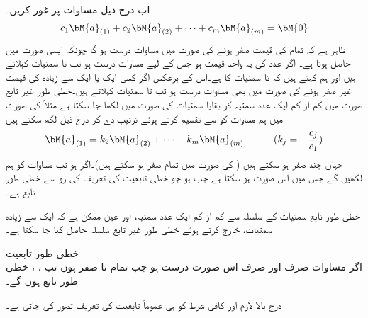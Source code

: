 اب درج ذیل مساوات پر غور کریں۔
\begin{align}\label{مساوات_الجبرا_غیر_تابعیت_الف}
c_1\bM{a}_{(1)}+c_2\bM{a}_{(2)}+\cdots+c_m\bM{a}_{(m)}=\bM{0}
\end{align}
ظاہر ہے کہ تمام  کی قیمت صفر ہونے کی صورت میں مساوات  درست ہو گا چونکہ ایسی صورت میں  حاصل ہوتا ہے۔ اگر  عدد  کی یہ واحد قیمت ہو جس کے لیے مساوات  درست ہو تب  تا  سمتیات  کہلاتے ہیں اور ہم کہتے ہیں کہ   تا  سمتیات کا  ہے۔اس کے برعکس اگر کسی ایک یا ایک سے زیادہ  کی قیمت غیر صفر ہونے کی صورت میں بھی مساوات  درست ہو تب  تا  سمتیات  کہلاتے ہیں۔خطی طور غیر تابع صورت میں کم از کم ایک عدد سمتیہ کو بقایا سمتیات کی صورت میں لکھا جا سکتا ہے مثلاً  کی صورت میں ہم مساوات  کو  سے تقسیم کرتے ہوئے ترتیب دے کر درج ذیل لکھ سکتے ہیں
\begin{align*}
\bM{a}_{(1)}=k_2\bM{a}_{(2)}+\cdots-k_m\bM{a}_{(m)}   \quad \quad\quad (k_j=-\frac{c_j}{c_1})
\end{align*}
جہاں چند  صفر ہو سکتے ہیں ( کی صورت میں تمام  صفر ہو سکتے ہیں)۔اگر  ہو تب  مساوات  کو ہم  لکھیں گے جس میں  اس صورت ہو سکتا ہے جب  ہو جو خطی تابعیت کی تعریف کی رو سے  خطی طور تابع ہے۔

خطی طور تابع سمتیات کے سلسلہ سے کم از کم ایک عدد سمتیہ، اور عین ممکن ہے کہ ایک سے زیادہ سمتیات، خارج کرتے ہوئے خطی طور غیر تابع سلسلہ حاصل کیا جا سکتا ہے۔

\quad خطی طور تابعیت\\
اگر مساوات  صرف اور صرف  اس صورت درست ہو جب تمام  تا  صفر ہوں تب ، ،  خطی طور تابع ہوں گے۔

درج بالا لازم  اور کافی شرط کو ہی عموماً تابعیت کی تعریف تصور کی جاتی ہے۔

